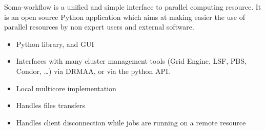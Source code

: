 \begin{multicols}{3}

% 



Soma-workflow is a unified and simple interface to parallel computing resource.
It is an open source Python application which aims at making easier the use of
parallel resources by non expert users and external software.
\begin{itemize}[nolistsep,topsep=0em,leftmargin=1pc]
\item Python library, and GUI
\item Interfaces with many cluster management tools (Grid Engine, LSF, PBS,
Condor, \ldots) via DRMAA, or via the python API.
\item Local multicore implementation
\item Handles files transfers
\item Handles client disconnection while jobs are running on a remote resource
\end{itemize}




\end{multicols}
